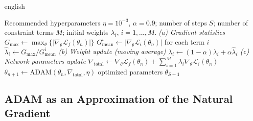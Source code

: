 \documentclass[12pt,letterpaper,twoside]{book}
\newcommand{\abs}[1]{\left\lvert #1 \right\rvert}
\newcommand{\Loss}{\mathcal{L}}
\begin{document}
\begin{hyphenrules}{english}
\begin{algorithm}[htbp]
  \caption{Learning rate annealing with ADAM.}
  \label{alg:lra}
  \begin{algorithmic}[1]
    \Require Recommended hyperparameters $\eta=10^{-3}$, $\alpha=0.9$; number of steps $S$; number of
      constraint terms $M$; initial weights $\lambda_i$, $i=1,\dots,M$.
      \State \textit{(a) Gradient statistics}
      \State $G_{\max}\gets\max_\theta\{\abs{\nabla_\theta\Loss_f(\theta_n)}\}$ 
      \State $G^{i}_{\mathrm{mean}}\gets\overline{\abs{\nabla_\theta\Loss_i(\theta_n)}}$ for each term $i$
      \State $\hat\lambda_i\gets G_{\max}/G^{i}_{\mathrm{mean}}$ 
      \State \textit{(b) Weight update (moving average)}
      \State $\lambda_i\gets(1-\alpha)\lambda_i+\alpha\hat\lambda_i$ 
      \State \textit{(c) Network parameters update}
      \State $\nabla_{\mathrm{total}}\gets\nabla_\theta\Loss_f(\theta_n)+\sum_{i=1}^{M}\lambda_i\nabla_\theta\Loss_i(\theta_n)$
      \State $\theta_{n+1}\gets\mathrm{ADAM}(\theta_n,\nabla_{\mathrm{total}},\eta)$ 
    \EndFor
    \State \Return optimized parameters $\theta_{S+1}$
  \end{algorithmic}
\end{algorithm}

\subsection{ADAM as an Approximation of the Natural Gradient}


\end{hyphenrules}
\end{document}
